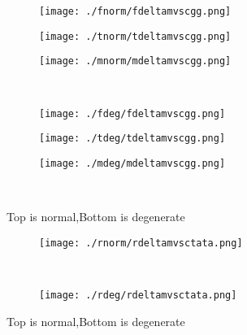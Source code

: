 \documentclass[aps,floats,floatfix,nofootinbib]{revtex4-1}
\begin{document}
\begin{center}
\begin{figure}
\begin{subfigure}{0.3\textwidth}
\texttt{[image: ./fnorm/fdeltamvscgg.png]}
\label{}
\end{subfigure}
\begin{subfigure}{0.3\textwidth}
\texttt{[image: ./tnorm/tdeltamvscgg.png]}
\label{}
\end{subfigure}
\begin{subfigure}{0.3\textwidth}
\texttt{[image: ./mnorm/mdeltamvscgg.png]}
\label{}
\end{subfigure}\\
\begin{subfigure}{0.3\textwidth}
\texttt{[image: ./fdeg/fdeltamvscgg.png]}
\label{}
\end{subfigure}
\begin{subfigure}{0.3\textwidth}
\texttt{[image: ./tdeg/tdeltamvscgg.png]}
\label{}
\end{subfigure}
\begin{subfigure}{0.3\textwidth}
\texttt{[image: ./mdeg/mdeltamvscgg.png]}
\label{}
\end{subfigure}\\
\caption{Top is normal,Bottom is degenerate}
\end{figure}
\end{center}

\begin{center}
\begin{figure}
\begin{subfigure}{1.0\textwidth}
\texttt{[image: ./rnorm/rdeltamvsctata.png]}
\label{}
\end{subfigure}\\
\begin{subfigure}{1.0\textwidth}
\texttt{[image: ./rdeg/rdeltamvsctata.png]}
\label{}
\end{subfigure}
\caption{Top is normal,Bottom is degenerate}
\end{figure}
\end{center}
\end{document}
